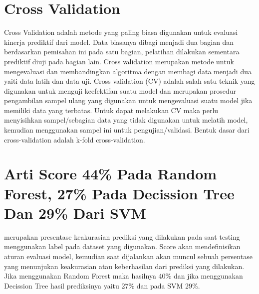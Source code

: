 \section{Cross Validation}
Cross Validation adalah metode yang paling biasa digunakan untuk evaluasi kinerja prediktif dari model. Data biasanya dibagi menjadi dua bagian dan berdasarkan pemisahan ini pada satu bagian, pelatihan dilakukan sementara prediktif diuji pada bagian lain. Cross validation merupakan metode untuk mengevaluasi dan membandingkan algoritma dengan membagi data menjadi dua yaiti data latih dan data uji. Cross validation (CV) adalah salah satu teknik yang digunakan untuk menguji keefektifan suatu model dan merupakan prosedur pengambilan sampel ulang yang digunakan untuk mengevaluasi suatu model jika memiliki data yang terbatas. Untuk dapat melakukan CV maka perlu menyisihkan sampel/sebagian data yang tidak digunakan untuk melatih model, kemudian menggunakan sampel ini untuk pengujian/validasi. Bentuk dasar dari cross-validation adalah k-fold cross-validation.

\section{Arti Score 44\% Pada Random Forest, 27\% Pada Decission Tree Dan 29\% Dari SVM}
merupakan presentase keakurasian prediksi yang dilakukan pada saat testing
menggunakan label pada dataset yang digunakan. Score akan mendefinisikan
aturan evaluasi model, kemudian saat dijalankan akan muncul sebuah persentase yang menunjukan keakurasian atau keberhasilan dari prediksi yang dilakukan. Jika
menggunakan Random Forest maka hasilnya 40\% dan jika menggunakan Decission Tree hasil prediksinya yaitu 27\% dan pada SVM 29\%.

